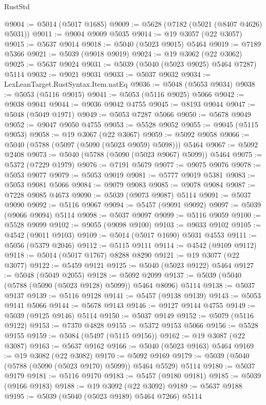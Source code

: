 \begin{lexlean}{RustStd}
\begin{coremodule}
@9004 := @5014 (@5017 @1685)
@9009 := @5628 (@7182 (@5021 (@8407 @4626) @5031))
@9011 := @9004 @9009 @5035
@9014 := @19 @3057 (@22 @3057)
@9015 := @5637 @9014
@9018 := @5040 (@5023 @9015) @5464
@9019 := @7189 @5366
@9021 := @5039 (@9018 @9019)
@9024 := @19 @3062 (@22 @3062)
@9025 := @5637 @9024
@9031 := @5039 (@5040 (@5023 @9025) @5464 @7287) @5114
@9032 := @9021 @9031
@9033 := @5037 @9032
@9034 := LexLeanTarget.RustSyntax.Item.natEq
@9036 := @5048 (@5653 @9034)
@9038 := @5053 (@5116 @9015)
@9041 := @5053 (@5116 @9025) @5066
@9042 := @9038 @9041
@9044 := @9036 @9042 @4755
@9045 := @8193 @9044
@9047 := @5048 (@5049 @1971)
@9049 := @5053 @7287 @5066
@9050 := @5678 @9049
@9052 := @9047 @9050 @4755
@9053 := @5528 @9052
@9055 := @9045 (@5115 @9053)
@9058 := @19 @3067 (@22 @3067)
@9059 := @5092 @9058
@9066 := @5040 (@5788 (@5097 (@5090 (@5023 @9059) @5098))) @5464
@9067 := @5092 @2408
@9073 := @5040 (@5788 (@5090 (@5023 @9067) @5099)) @5464
@9075 := @5372 (@7229 @1979)
@9076 := @7191 @5679
@9077 := @9075 @9076
@9078 := @5053 @9077
@9079 := @5053 @9019
@9081 := @5777 @9019 @5381
@9083 := @5053 @9081 @5066
@9084 := @9079 @9083
@9085 := @9078 @9084
@9087 := @7228 @9085 @4673
@9090 := @5039 (@9073 @9087) @5114
@9091 := @5037 @9090
@9092 := @5116 @9067
@9094 := @5457 (@9091 @9092)
@9097 := @5039 (@9066 @9094) @5114
@9098 := @5037 @9097
@9099 := @5116 @9059
@9100 := @5528 @9099
@9102 := @9055 (@9098 @9100)
@9103 := @9033 @9102
@9105 := @4542 (@9011 @9103)
@9109 := @5014 (@5017 @1690) @5031 @4553
@9111 := @5056 (@5379 @2046)
@9112 := @5115 @9111
@9114 := @4542 (@9109 @9112)
@9118 := @5014 (@5017 @1767) @8288 @8290
@9121 := @19 @3077 (@22 @3077)
@9122 := @5459 @9121
@9125 := @5040 (@5023 @9122) @5464
@9127 := @5048 (@5049 @2055)
@9128 := @5092 @2099
@9137 := @5039 (@5040 (@5788 (@5090 (@5023 @9128) @5099)) @5464 @8096) @5114
@9138 := @5037 @9137
@9139 := @5116 @9128
@9141 := @5457 (@9138 @9139)
@9143 := @5053 @9141 @5066
@9144 := @5678 @9143
@9146 := @9127 @9144 @4755
@9149 := @5039 (@9125 @9146) @5114
@9150 := @5037 @9149
@9152 := @5079 (@5116 @9122)
@9153 := @7370 @4828
@9155 := @5372 @9153 @5066
@9156 := @5528 @9155
@9159 := @5084 (@5497 (@5115 @9156))
@9162 := @19 @3087 (@22 @3087)
@9163 := @5637 @9162
@9166 := @5040 (@5023 @9163) @5464
@9169 := @19 @3082 (@22 @3082)
@9170 := @5092 @9169
@9179 := @5039 (@5040 (@5788 (@5090 (@5023 @9170) @5099)) @5464 @5529) @5114
@9180 := @5037 @9179
@9181 := @5116 @9170
@9183 := @5457 (@9180 @9181)
@9185 := @5039 (@9166 @9183)
@9188 := @19 @3092 (@22 @3092)
@9189 := @5637 @9188
@9195 := @5039 (@5040 (@5023 @9189) @5464 @7266) @5114

\end{coremodule}
\end{lexlean}
